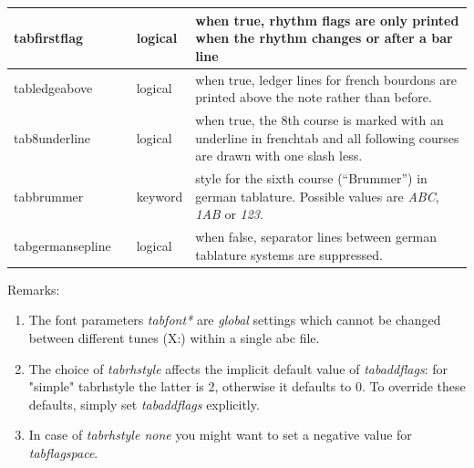 \documentclass[a4paper]{article}
\begin{document}
\begin{center}
\begin{longtable}{|l|l|l|p{7.2cm}|}
tabfirstflag & & logical & when true, rhythm flags are only printed when the
    rhythm changes or after a bar line \\ \hline
tabledgeabove & & logical & when true, ledger lines for french bourdons
    are printed above the note rather than before. \\ \hline
tab8underline & & logical & when true, the 8th course is marked with an
    underline in frenchtab and all following courses are drawn with one
    slash less. \\ \hline
tabbrummer & & keyword & style for the sixth course (``Brummer'') in
    german tablature. Possible values are {\it ABC}, {\it 1AB} or {\it 123}.
    \\ \hline
tabgermansepline & & logical & when false, separator lines between german
    tablature systems are suppressed. \\ \hline
\end{longtable}
\end{center}

Remarks:
\begin{enumerate}
\item The font parameters {\it tabfont*} are {\it global} settings
    which cannot be changed between different tunes (X:) within
    a single abc file.
\item The choice of {\it tabrhstyle} affects the implicit default value of
    {\it tabaddflags}: for "simple" tabrhstyle the latter is 2, otherwise
    it defaults to 0. To override these defaults, simply set {\it tabaddflags}
    explicitly.
\item In case of {\it tabrhstyle none} you might want to set a negative
    value for {\it tabflagspace}.
\end{enumerate}
\end{document}
